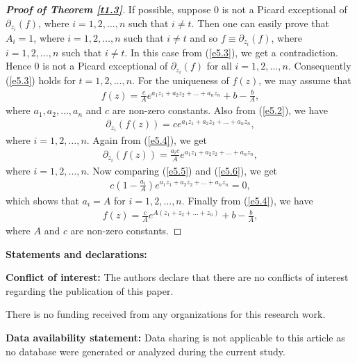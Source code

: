 \documentclass[11pt, reqno]{amsart}
\newtheorem*{cor A}{Corollary A}
\newtheorem*{cor B}{Corollary B}
\numberwithin{equation}{section}
\begin{document}
\begin{proof}[{\bf Proof of Theorem \ref{t1.3}}]
If possible, suppose $0$ is not a Picard exceptional of $\partial_{z_i}(f)$, where $i=1,2,\ldots,n$ such that $i\neq t$. Then one can easily prove that $A_i=1$, where $i=1,2,\ldots,n$ such that $i\neq t$ and so $f\equiv \partial_{z_i}(f)$, where $i=1,2,\ldots,n$ such that $i\neq t$. In this case from (\ref{e5.3}), we get a contradiction. Hence $0$ is not a Picard exceptional of $\partial_{z_i}(f)$ for all $i=1,2,\ldots,n$. Consequently (\ref{e5.3}) holds for $t=1,2,\ldots,n$. For the uniqueness of $f(z)$, we may assume that
\begin{align}\label{e5.4}
f(z)=\frac{c}{A}e^{a_{1}z_1+a_{2}z_2+\ldots+a_{n}z_n}+b-\frac{b}{A},
\end{align}
where $a_{1},a_{2},\ldots,a_{n}$ and $c$ are non-zero constants. Also from (\ref{e5.2}), we have
\begin{align}\label{e5.5}
\partial_{z_i}(f(z))=ce^{a_{1}z_1+a_{2}z_2+\ldots+a_{n}z_n},
\end{align} 
where $i=1,2,\ldots,n$.
Again from (\ref{e5.4}), we get 
\begin{align}\label{e5.6}
\partial_{z_i}(f(z))=\frac{a_ic}{A}e^{a_1z_1+a_2z_2+\ldots+a_nz_n},
\end{align}
where $i=1,2,\ldots,n$.
Now comparing (\ref{e5.5}) and (\ref{e5.6}), we get
\begin{align*}
c\left(1-\frac{a_i}{A}\right)e^{a_1z_1+a_2z_2+\ldots+a_nz_n}=0,
\end{align*}
which shows that $a_i=A$ for $i=1,2,\ldots,n$. Finally from (\ref{e5.4}), we have 
\begin{align}\label{e5.4}
f(z)=\frac{c}{A}e^{A(z_1+z_2+\ldots+z_n)}+b-\frac{b}{A},
\end{align}
where $A$ and $c$ are non-zero constants.
\end{proof}

\medskip
{\bf Statements and declarations:}


\smallskip
\noindent \textbf {Conflict of interest:} The authors declare that there are no conflicts of interest regarding the publication of this paper.

\smallskip
{} There is no funding received from any organizations for this research work.

\smallskip
\noindent \textbf {Data availability statement:}  Data sharing is not applicable to this article as no database were generated or analyzed during the current study.
\end{document}
